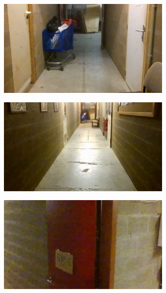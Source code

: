 \begin{figure}[H]
    \centering
    \begin{subfigure}{0.32\textwidth}
        \centering
        \includegraphics[width=\textwidth]{resources/png/07/depth/original/0.png}
        \vspace{0.5em}
    \end{subfigure}
    \hfill
    \begin{subfigure}{0.32\textwidth}
        \centering
        \includegraphics[width=\textwidth]{resources/png/07/depth/original/1.png}
        \vspace{0.5em}
    \end{subfigure}
    \hfill
    \begin{subfigure}{0.32\textwidth}
        \centering
        \includegraphics[width=\textwidth]{resources/png/07/depth/original/2.png}

\end{subfigure}
\end{figure}
